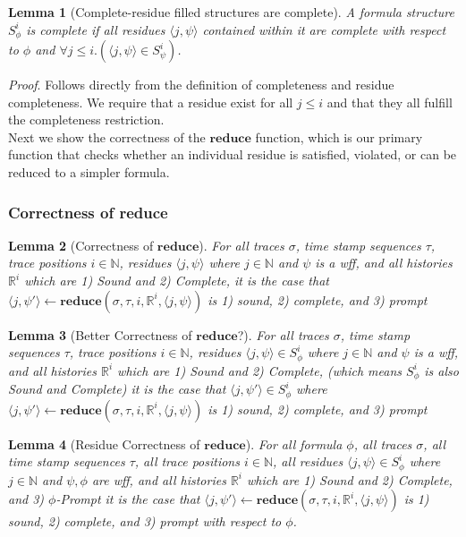 \documentclass[10pt,a4paper]{article}
\newcommand{\rp}[2]{\ensuremath{\langle #1, #2 \rangle}}
\newtheorem{lemma}{Lemma}
\begin{document}
\begin{lemma}[Complete-residue filled structures are complete]
A formula structure $S^i_{\phi}$ is complete if all residues $\rp{j}{\psi}$ contained within it are complete with respect to $\phi$ and $\forall j \leq i.(\rp{j}{\psi} \in S^i_{\psi})$.
\end{lemma}

\noindent \emph{Proof}. Follows directly from the definition of completeness and residue completeness. We require that a residue exist for all $j \leq i$ and that they all fulfill the completeness restriction. \\

Next we show the correctness of the $\mathbf{reduce}$ function, which is our primary function that checks whether an individual residue is satisfied, violated, or can be reduced to a simpler formula.

\subsubsection{Correctness of reduce}
\begin{lemma}[Correctness of $\mathbf{reduce}$]
For all traces $\sigma$, time stamp sequences $\tau$, trace positions $i \in \mathbb{N}$, residues $\rp{j}{\psi}$ where $j \in \mathbb{N}$ and $\psi$ is a wff, and all histories $\mathbb{R}^i$ which are 1) Sound and 2) Complete,
%
it is the case that $\rp{j}{\psi'} \leftarrow \mathbf{reduce}(\sigma,\tau,i,\mathbb{R}^i, \rp{j}{\psi})$ is 1) sound, 2) complete, and 3) prompt
\end{lemma}

\begin{lemma}[Better Correctness of $\mathbf{reduce}$?]
For all traces $\sigma$, 
time stamp sequences $\tau$, 
trace positions $i \in \mathbb{N}$, 
residues $\rp{j}{\psi} \in S^i_{\phi}$ where $j \in \mathbb{N}$ and $\psi$ is a wff, 
and all histories $\mathbb{R}^i$ which are 1) Sound and 2) Complete, (which means $S^i_{\phi}$ is also Sound and Complete)
%
it is the case that $\rp{j}{\psi'} \in S^i_{\phi}$ where $ \rp{j}{\psi'} \leftarrow \mathbf{reduce}(\sigma,\tau,i,\mathbb{R}^i, \rp{j}{\psi})$ is 1) sound, 2) complete, and 3) prompt
\end{lemma}

\begin{lemma}[Residue Correctness of $\mathbf{reduce}$]
For all formula $\phi$,
all traces $\sigma$, 
all time stamp sequences $\tau$, 
all trace positions $i \in \mathbb{N}$, 
all residues $\rp{j}{\psi} \in S^i_{\phi}$ where $j \in \mathbb{N}$ and $\psi,\phi$ are wff, 
and all histories $\mathbb{R}^i$ which are 1) Sound and 2) Complete, and 3) $\phi$-Prompt 
%
it is the case that $\rp{j}{\psi'} \leftarrow \mathbf{reduce}(\sigma,\tau,i,\mathbb{R}^i, \rp{j}{\psi})$ is 1) sound, 2) complete, and 3) prompt with respect to $\phi$.
\end{lemma}
\end{document}
